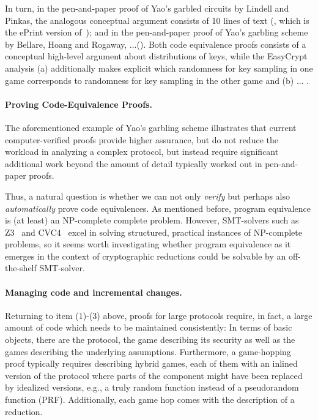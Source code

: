 In turn, in the pen-and-paper proof of Yao's garbled circuits by Lindell and Pinkas, the analogous conceptual argument consists of 10 lines of text (\cite[page 23]{x}, which is the ePrint version of~\cite{X}); and in the pen-and-paper proof of Yao's garbling scheme by Bellare, Hoang and Rogaway, ...(\cite[page ..]{X}). Both code equivalence proofs consists of a conceptual high-level argument about distributions of keys, while the EasyCrypt analysis (a) additionally makes explicit which randomness for key sampling in one game corresponds to randomness for key sampling in the other game and (b) ... .

\paragraph{Proving Code-Equivalence Proofs.}
The aforementioned example of Yao's garbling scheme illustrates that current
computer-verified proofs provide higher assurance, but do not reduce the
workload in analyzing a complex protocol, but instead
%
require significant additional work
beyond the amount of detail typically worked out in pen-and-paper proofs. 

Thus, a natural question is whether we can not only \emph{verify} but
perhaps also \emph{automatically} prove code equivalences. As mentioned
before, program equivalence is (at least) an NP-complete complete problem.
However, SMT-solvers such as Z3~\cite{X} and CVC4~\cite{X} excel in 
solving structured, practical instances of NP-complete problems, so it
seems worth investigating whether program equivalence as it emerges in
the context of cryptographic reductions could be solvable by an off-the-shelf
SMT-solver. %

\paragraph{Managing code and incremental changes.}
Returning to item (1)-(3) above, proofs for large protocols require, in fact,
a large amount of code which needs to be maintained consistently: In terms of
basic objects, there are the protocol, the game describing its security as well
 as the games describing the underlying assumptions. Furthermore, a game-hopping
proof typically requires describing hybrid games, each of them with an inlined
version of the protocol where parts of the component might have been replaced
by idealized versions, e.g., a truly random function instead of a pseudorandom function (PRF). Additionally, each game hop comes with the description of a reduction.

